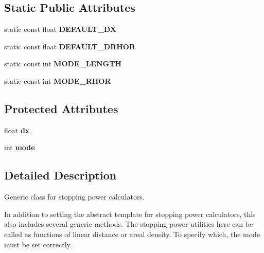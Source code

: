 \subsection*{Static Public Attributes}
\begin{DoxyCompactItemize}
\item 
\hypertarget{class_stop_pow_a8e446f3ef0b19bb4388005ebfc648b86}{static const float {\bfseries D\-E\-F\-A\-U\-L\-T\-\_\-\-D\-X}}\label{class_stop_pow_a8e446f3ef0b19bb4388005ebfc648b86}

\item 
\hypertarget{class_stop_pow_a9d5bf50a10d405dbff5a7b8136299352}{static const float {\bfseries D\-E\-F\-A\-U\-L\-T\-\_\-\-D\-R\-H\-O\-R}}\label{class_stop_pow_a9d5bf50a10d405dbff5a7b8136299352}

\item 
\hypertarget{class_stop_pow_a5eabfafea1a01bcd23e1dd85236de698}{static const int {\bfseries M\-O\-D\-E\-\_\-\-L\-E\-N\-G\-T\-H}}\label{class_stop_pow_a5eabfafea1a01bcd23e1dd85236de698}

\item 
\hypertarget{class_stop_pow_a179d24150a83c29851157632ea24f20f}{static const int {\bfseries M\-O\-D\-E\-\_\-\-R\-H\-O\-R}}\label{class_stop_pow_a179d24150a83c29851157632ea24f20f}

\end{DoxyCompactItemize}
\subsection*{Protected Attributes}
\begin{DoxyCompactItemize}
\item 
\hypertarget{class_stop_pow_ab4ef05802afb22891bda12810161b25d}{float {\bfseries dx}}\label{class_stop_pow_ab4ef05802afb22891bda12810161b25d}

\item 
\hypertarget{class_stop_pow_a748cf58ef8c76cf0e6e73724c7351f91}{int {\bfseries mode}}\label{class_stop_pow_a748cf58ef8c76cf0e6e73724c7351f91}

\end{DoxyCompactItemize}


\subsection{Detailed Description}
Generic class for stopping power calculators. 

In addition to setting the abstract template for stopping power calculators, this also includes several generic methods. The stopping power utilities here can be called as functions of linear distance or areal density. To specify which, the mode must be set correctly.

